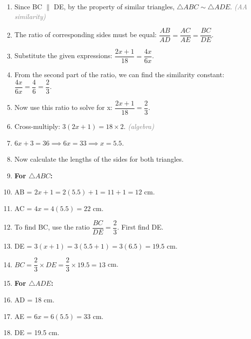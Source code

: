 \documentclass{article}
\newenvironment{steps}{%
  \begin{enumerate}[label=\textcolor{primary}{Step~\arabic*:}, leftmargin=*]
}{\end{enumerate}}
\newcommand{\reason}[1]{\hfill\textit{\textcolor{gray}{(#1)}}}
\begin{document}
\begin{center}
\end{center}

\begin{steps}
    \item Since BC $\parallel$ DE, by the property of similar triangles, $\triangle ABC \sim \triangle ADE$. \reason{AA similarity}
    \item The ratio of corresponding sides must be equal: $\dfrac{AB}{AD} = \dfrac{AC}{AE} = \dfrac{BC}{DE}$.
    \item Substitute the given expressions: $\dfrac{2x+1}{18} = \dfrac{4x}{6x}$.
    \item From the second part of the ratio, we can find the similarity constant: $\dfrac{4x}{6x} = \dfrac{4}{6} = \dfrac{2}{3}$.
    \item Now use this ratio to solve for x: $\dfrac{2x+1}{18} = \dfrac{2}{3}$.
    \item Cross-multiply: $3(2x+1) = 18 \times 2$. \reason{algebra}
    \item $6x + 3 = 36 \implies 6x = 33 \implies x = 5.5$.
    \item Now calculate the lengths of the sides for both triangles.
    \item \textbf{For $\triangle ABC$:}
    \item AB = $2x+1 = 2(5.5)+1 = 11+1=12$ cm.
    \item AC = $4x = 4(5.5) = 22$ cm.
    \item To find BC, use the ratio $\dfrac{BC}{DE} = \dfrac{2}{3}$. First find DE.
    \item DE = $3(x+1) = 3(5.5+1) = 3(6.5) = 19.5$ cm.
    \item $BC = \dfrac{2}{3} \times DE = \dfrac{2}{3} \times 19.5 = 13$ cm.
    \item \textbf{For $\triangle ADE$:}
    \item AD = 18 cm.
    \item AE = $6x = 6(5.5) = 33$ cm.
    \item DE = 19.5 cm.
\end{steps}
\end{document}
